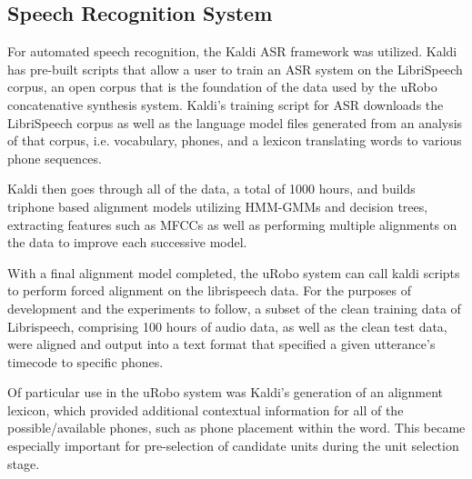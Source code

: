 \documentclass[10pt, journal, compsoc]{IEEEtran}
\begin{document}
\subsection{Speech Recognition System}
For automated speech recognition, the Kaldi ASR framework was utilized. Kaldi has pre-built scripts that allow a user to train an ASR system on the LibriSpeech corpus\cite{unknown}, an open corpus that is the foundation of the data used by the uRobo concatenative synthesis system. Kaldi's training script for ASR downloads the LibriSpeech corpus as well as the language model files generated from an analysis of that corpus, i.e. vocabulary, phones, and a lexicon translating words to various phone sequences.\par
Kaldi then goes through all of the data, a total of 1000 hours, and builds triphone based alignment models utilizing HMM-GMMs and decision trees, extracting features such as MFCCs as well as performing multiple alignments on the data to improve each successive model.\par
With a final alignment model completed, the uRobo system can call kaldi scripts to perform forced alignment on the librispeech data. For the purposes of development and the experiments to follow, a subset of the clean training data of Librispeech, comprising 100 hours of audio data, as well as the clean test data, were aligned and output into a text format that specified a given utterance's timecode to specific phones. \par
Of particular use in the uRobo system was Kaldi's generation of an alignment lexicon, which provided additional contextual information for all of the possible/available phones, such as phone placement within the word. This became especially important for pre-selection of candidate units during the unit selection stage.
\end{document}
